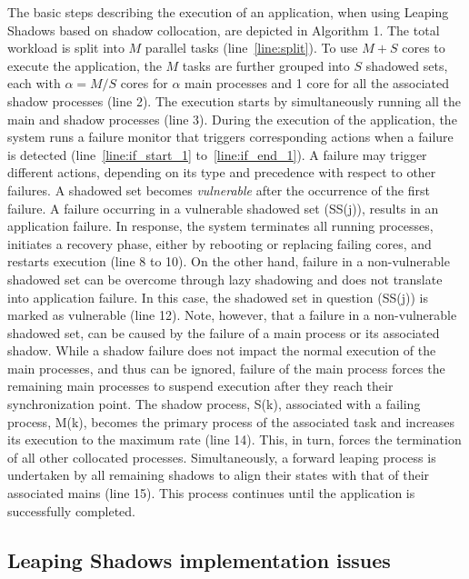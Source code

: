The basic steps describing the execution of an application, when using Leaping Shadows based on shadow collocation, are depicted in Algorithm 1.
The total workload is split into $M$ parallel tasks (line~\ref{line:split}). %
To use $M+S$ cores to execute the application, the $M$ tasks are further grouped into $S$ shadowed sets, each with $\alpha=M/S$ cores for $\alpha$ main processes and 1 core for all the associated shadow processes (line 2).  
The execution starts by simultaneously running all the main and shadow processes (line 3).
During the execution of the application,
the system runs a failure monitor that triggers corresponding actions when a failure is detected (line~\ref{line:if_start_1} to~\ref{line:if_end_1}). A failure may trigger different actions, depending on its type and precedence with respect to other failures.  A shadowed set becomes {\it vulnerable} after the occurrence of the first failure. A failure occurring in a vulnerable shadowed set (SS(j)), results in an application failure. In response, the system terminates all running 
processes, initiates a recovery phase, either by rebooting or replacing failing cores,  and restarts execution (line 8 to 10). %
On the other hand, failure in a non-vulnerable shadowed set
can be overcome through lazy shadowing and does not translate into application failure. In this case, the shadowed set in question (SS(j)) is marked as vulnerable (line 12). Note, however, that a failure in a non-vulnerable shadowed set, can be caused by the failure of a main process or its associated shadow.  While a shadow 
failure does not impact the normal execution of the main processes, and thus can be ignored, failure of the main process forces the remaining main processes to suspend execution after they reach their synchronization point.  The shadow process, S(k), associated with a failing process, M(k),  becomes the primary process of the associated task and increases its execution to the maximum rate (line 14). This, in turn, forces the termination of all other collocated processes.  Simultaneously, a forward leaping process is undertaken by all remaining shadows to align their states with that of their associated mains (line 15).  
This process continues until the application is successfully completed.

\subsection{Leaping Shadows implementation issues}






